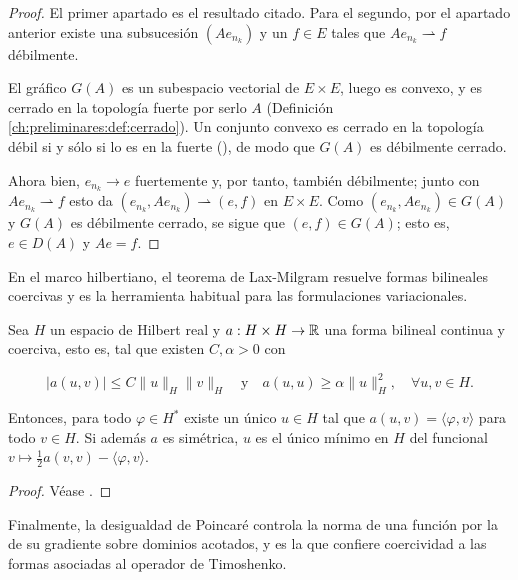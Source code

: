 \begin{proof}
El primer apartado es el resultado citado. Para el segundo, por el apartado
anterior existe una subsucesión $(Ae_{n_k})$ y un $f \in E$ tales que
$Ae_{n_k} \rightharpoonup f$ débilmente.

El gráfico $G(A)$ es un subespacio vectorial de $E \times E$, luego es convexo, y
es cerrado en la topología fuerte por serlo $A$
(Definición \ref{ch:preliminares:def:cerrado}). Un conjunto convexo es cerrado en
la topología débil si y sólo si lo es en la fuerte
(\cite[Teorema~3.7]{brezis-2011-fun-ana-sob}), de modo que $G(A)$ es débilmente
cerrado.

Ahora bien, $e_{n_k} \rightarrow e$ fuertemente y, por tanto, también débilmente;
junto con $Ae_{n_k} \rightharpoonup f$ esto da
$(e_{n_k}, Ae_{n_k}) \rightharpoonup (e, f)$ en $E \times E$. Como
$(e_{n_k}, Ae_{n_k}) \in G(A)$ y $G(A)$ es débilmente cerrado, se sigue que
$(e,f) \in G(A)$; esto es, $e \in D(A)$ y $Ae = f$.
\end{proof}

En el marco hilbertiano, el teorema de Lax-Milgram resuelve formas bilineales
coercivas y es la herramienta habitual para las formulaciones variacionales.\\

\begin{Teorema}
\label{ch:preliminares:th:laxMilgram}

Sea $H$ un espacio de Hilbert real y $a : H \times H \rightarrow \mathbb{R}$ una forma
bilineal continua y coerciva, esto es, tal que existen $C, \alpha > 0$ con

\[|a(u, v)| \leq C \lVert u \rVert_H \lVert v \rVert_H \quad \text{y} \quad a(u, u) \geq \alpha \lVert u \rVert_H^2, \quad \forall u, v \in H.\]

Entonces, para todo $\varphi \in H^*$ existe un único $u \in H$ tal que
$a(u, v) = \langle \varphi, v \rangle$ para todo $v \in H$. Si además $a$ es
simétrica, $u$ es el único mínimo en $H$ del funcional
$v \mapsto \tfrac{1}{2}a(v, v) - \langle \varphi, v \rangle$.
\end{Teorema}

\begin{proof}
Véase \cite[Corolario~5.8]{brezis-2011-fun-ana-sob}.
\end{proof}

Finalmente, la desigualdad de Poincaré controla la norma de una función por la de
su gradiente sobre dominios acotados, y es la que confiere coercividad a las
formas asociadas al operador de Timoshenko.\\

